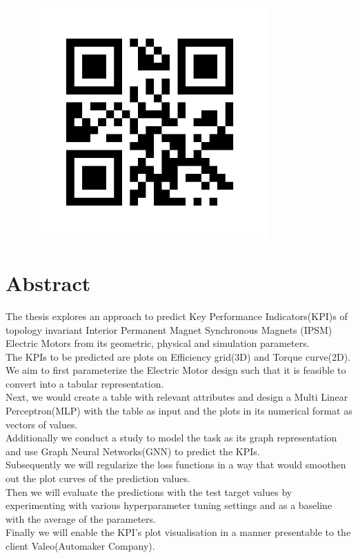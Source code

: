 \documentclass{report} %
\begin{document}
\begin{figure}[h]
    \includegraphics[width=0.8\textwidth]{./ReportImages/qrcode.png} %
    \label{fig:your-image}
\end{figure}

\newpage %

\chapter*{Abstract}

The thesis explores an approach to predict Key Performance Indicators(KPI)s of topology invariant Interior Permanent Magnet Synchronous Magnets (IPSM) Electric Motors from its geometric, physical and simulation parameters.\\
The KPIs to be predicted are plots on Efficiency grid(3D) and Torque curve(2D).\\
We aim to first parameterize the Electric Motor design such that it is feasible to convert into a tabular representation. \\
Next, we would create a table with relevant attributes and design a Multi Linear Perceptron(MLP) with the table as input and the plots in its numerical format as vectors of values.\\
Additionally we conduct a study to model the task as its graph representation and use Graph Neural Networks(GNN) to predict the KPIs.\\
Subsequently we will regularize the loss functions in a way that would smoothen out the plot curves of the prediction values.\\
Then we will evaluate the predictions with the test target values by experimenting with various hyperparameter tuning settings and as a baseline with the average of the parameters.\\
Finally we will enable the KPI's plot visualisation in a manner presentable to the client Valeo(Automaker Company).\\
\end{document}
